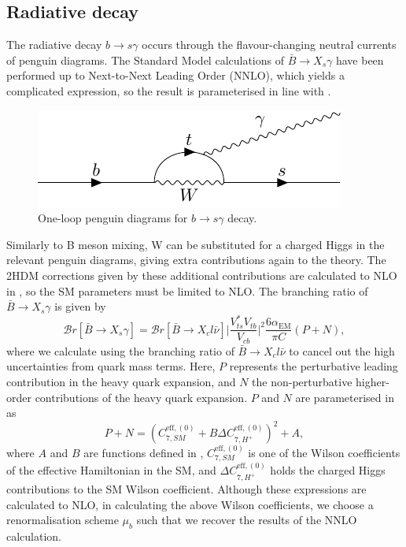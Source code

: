 \documentclass[a4paper,12pt]{article}
\begin{document}
\subsection{Radiative decay}
\label{subsec:rad}
The radiative decay $b\to s\gamma$ occurs through the flavour-changing neutral currents of penguin diagrams.
The Standard Model calculations of $\bar{B}\to X_s\gamma$ have been performed up to Next-to-Next Leading Order (NNLO), which yields a complicated expression, so the result is parameterised in line with \cite{desc,susy}.
\begin{figure}[H]
    \centering
    \includegraphics[width=\textwidth]{bsgam.pdf}
    \caption{\label{fig:bsgam} One-loop penguin diagrams for $b\to s\gamma$ decay.}
\end{figure}
Similarly to B meson mixing, W can be substituted for a charged Higgs in the relevant penguin diagrams, giving extra contributions again to the theory. 
The 2HDM corrections given by these additional contributions are calculated to NLO in \cite{susy}, so the SM parameters must be limited to NLO.
The branching ratio of $\bar{B}\to X_s\gamma$ is given by
\begin{equation}
    \label{eq:xsgam}
    \mathcal{B}r[\bar{B}\to X_s\gamma] = \mathcal{B}r[\bar{B}\to X_cl\bar{\nu}] \bigg|\frac{V_{ts}^*V_{tb}}{V_{cb}}\bigg|^2 \frac{6\alpha_{\text{EM}}}{\pi C}(P+N),
\end{equation}
where we calculate using the branching ratio of $\bar{B}\to X_cl\bar{\nu}$ to cancel out the high uncertainties from quark mass terms.
Here, $P$ represents the perturbative leading contribution in the heavy quark expansion, and $N$ the non-perturbative higher-order contributions of the heavy quark expansion.
$P$ and $N$ are parameterised in \cite{desc,susy} as 
\begin{equation}
    \label{eq:pplsn}
    P+N = (C^{\text{eff},(0)}_{7,SM}+B\Delta C_{7,H^+}^{\text{eff},(0)})^2+A,
\end{equation}
where $A$ and $B$ are functions defined in \cite{desc}, $C_{7,SM}^{\text{eff},(0)}$ is one of the Wilson coefficients of the effective Hamiltonian in the SM, and $\Delta C_{7,H^+}^{\text{eff},(0)}$ holds the charged Higgs contributions to the SM Wilson coefficient. 
Although these expressions are calculated to NLO, in calculating the above Wilson coefficients, we choose a renormalisation scheme $\mu_b$ such that we recover the results of the NNLO calculation. 
\end{document}
